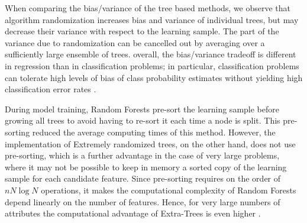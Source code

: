 When comparing the bias/variance of the tree based methods, we observe that algorithm randomization increases bias and variance of individual trees, but  may decrease their variance with respect to the learning sample. The part of the variance due to randomization can be cancelled out by averaging over a
sufficiently large ensemble of trees. overall, the bias/variance tradeoff is different in regression than in classification problems;
in particular, classification problems can tolerate high levels of bias of class probability estimates without yielding high classification error rates \citep{geurts2006extremely}. 

During model training, Random Forests pre-sort the learning sample before growing all trees to avoid having to re-sort it each time a node is split. This pre-sorting reduced the average computing times of this method. However, the implementation of Extremely randomized trees, on the other hand, does not use pre-sorting, which is a further advantage in the case of very large problems, where it may not be possible to keep in memory a sorted copy of the learning sample for each candidate feature. Since pre-sorting requires on the order of $nN\log N$ operations, it makes the
computational complexity of Random Forests depend linearly on the number of features. Hence, for very large numbers of attributes the computational advantage of Extra-Trees is even higher \citep{geurts2006extremely}.



